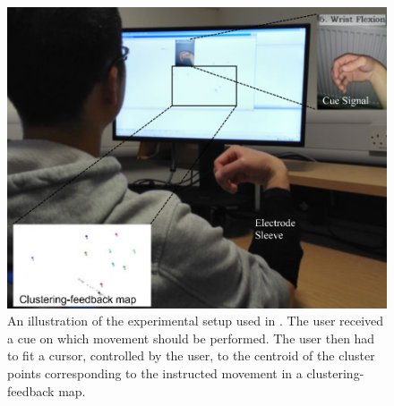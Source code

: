 \begin{figure}[H]                 
	\includegraphics[width=.7\textwidth]{figures/xBackground/FangUserTraining}  
	\caption{An illustration of the experimental setup used in \cite{Fang2017}. The user received a cue on which movement should be performed. The user then had to fit a cursor, controlled by the user, to the centroid of the cluster points corresponding to the instructed movement in a clustering-feedback map.}
	\label{fig:FangUserTraining} 
\end{figure}



